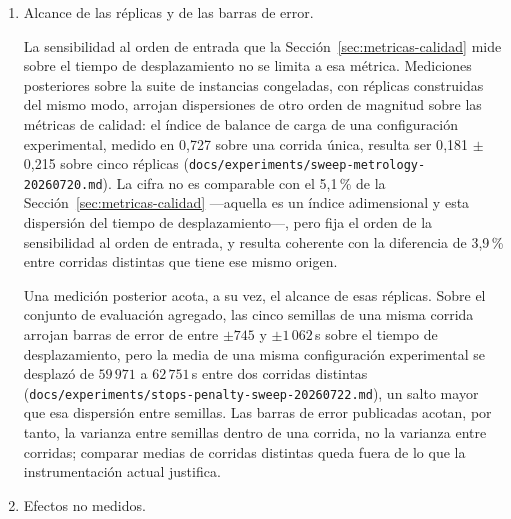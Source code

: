 \begin{enumerate}
Defecto 4 --- Criterio de degeneración mixto.
El criterio de rutas degeneradas original mezclaba dos fenómenos: un aislamiento
geográfico que captura el conteo de paradas (menos de cinco) y un perjuicio operativo real
que captura la duración (menos de 1\,800 segundos). Una ruta con tres paradas y
10\,485\,s de duración ocupa el 97\,\% del presupuesto diario y constituye una jornada
completa, aunque viole el conteo. En la revisión se descartó la cláusula de paradas por
indirecta, con lo que cuarenta y cinco de las ciento seis filas re-juzgables quedan
absueltas y sesenta y una persisten por duración.

\item Alcance de las réplicas y de las barras de error.
\label{anx:alcance-replicas}

La sensibilidad al orden de entrada que la Sección~\ref{sec:metricas-calidad} mide
sobre el tiempo de desplazamiento no se limita a esa métrica. Mediciones posteriores
sobre la suite de instancias congeladas, con réplicas construidas del mismo modo,
arrojan dispersiones de otro orden de
magnitud sobre las métricas de calidad: el índice de balance de carga de una
configuración experimental, medido en 0{,}727 sobre una corrida única, resulta ser
0{,}181 $\pm$ 0{,}215 sobre cinco réplicas
(\texttt{docs/experiments/sweep-metrology-20260720.md}). La cifra no es
comparable con el 5{,}1\,\% de la Sección~\ref{sec:metricas-calidad} ---aquella es
un índice adimensional y esta dispersión del tiempo de desplazamiento---, pero fija
el orden de la sensibilidad al orden de entrada, y resulta coherente con la
diferencia de 3{,}9\,\% entre corridas distintas que tiene ese mismo origen.

Una medición posterior acota, a su vez, el alcance de esas réplicas. Sobre el
conjunto de evaluación agregado, las cinco semillas de una misma corrida arrojan
barras de error de entre $\pm 745$ y $\pm 1\,062$\,s sobre el tiempo de
desplazamiento, pero la media de una misma configuración experimental se desplazó
de $59\,971$ a $62\,751$\,s entre dos corridas distintas
(\texttt{docs/experiments/stops-penalty-sweep-20260722.md}), un salto mayor que
esa dispersión entre semillas. Las barras de error publicadas acotan, por tanto,
la varianza entre semillas dentro de una corrida, no la varianza entre corridas;
comparar medias de corridas distintas queda fuera de lo que la instrumentación
actual justifica.

\item Efectos no medidos.
\label{anx:efectos-no-medidos}


\end{enumerate}
